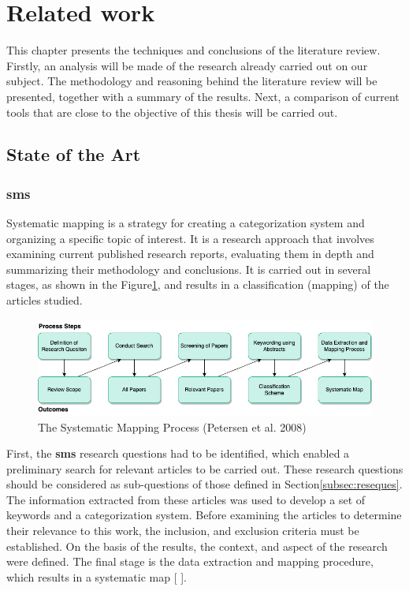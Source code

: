 \section{Related work\label{sec:relwork}}
This chapter presents the techniques and conclusions of the literature review. Firstly, an analysis will be made of the research already carried out on our subject. The methodology and reasoning behind the literature review will be presented, together with a summary of the results. Next, a comparison of current tools that are close to the objective of this thesis will be carried out.\\

    \subsection{State of the Art}
        \subsubsection{\acrfull{sms}}
        Systematic mapping is a strategy for creating a categorization system and organizing a specific topic of interest. It is a research approach that involves examining current published research reports, evaluating them in depth and summarizing their methodology and conclusions. It is carried out in several stages, as shown in the Figure\ref{fig:SysMapProcess}, and results in a classification (mapping) of the articles studied.\\

        \begin{figure}[H]
            \centering
            \includegraphics[scale=0.6]{images/RelatedWork-SysMapProcess.drawio.png}
            \caption{\label{fig:SysMapProcess}  The Systematic Mapping Process (Petersen et al. 2008)}
        \end{figure}

        First, the \textbf{\acrshort{sms}} research questions had to be identified, which enabled a preliminary search for relevant articles to be carried out. These research questions should be considered as sub-questions of those defined in Section\ref{subsec:reseques}. The information extracted from these articles was used to develop a set of keywords and a categorization system. Before examining the articles to determine their relevance to this work, the inclusion, and exclusion criteria must be established. On the basis of the results, the context, and aspect of the research were defined. The final stage is the data extraction and mapping procedure, which results in a systematic map [ ].\\

